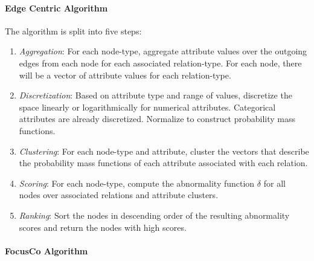 \documentclass[11pt, oneside]{article}   	%
\begin{document}
\paragraph{Edge Centric Algorithm}
\quad

\quad The algorithm \cite{edgecentric} is split into five steps:
\begin{enumerate}
\item \emph{Aggregation}: For each node-type, aggregate attribute values over the outgoing edges from each node for each associated relation-type.
For each node, there will be a vector of attribute values for each relation-type.
\item \emph{Discretization}: Based on attribute type and range of values, discretize the space linearly or logarithmically for numerical attributes.
Categorical attributes are already discretized.
Normalize to construct probability mass functions.
\item \emph{Clustering}: For each node-type and attribute, cluster the vectors that describe the probability mass functions of each attribute associated with each relation.
\item \emph{Scoring}: For each node-type, compute the abnormality function $\delta$ for all nodes over associated relations and attribute clusters.
\item \emph{Ranking}: Sort the nodes in descending order of the resulting abnormality scores and return the nodes with high scores.
\end{enumerate}

\paragraph{FocusCo Algorithm}
\quad
\end{document}
